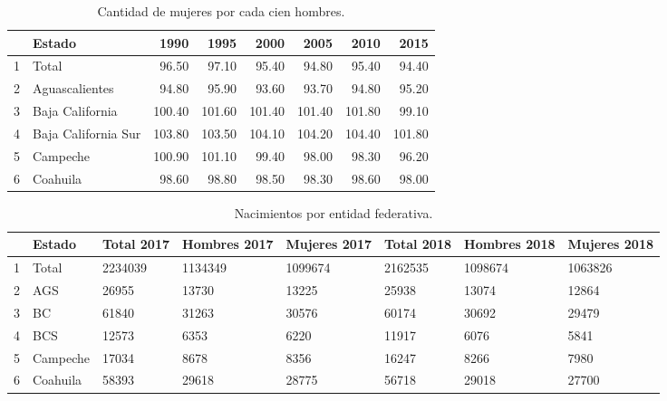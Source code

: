 \documentclass[12pt,letterpaper]{article}
\begin{document}
\begin{table}
	\centering
	\caption{Cantidad de mujeres por cada cien hombres.}
	\begin{tabular}{rlrrrrrr}
		\hline
		& Estado & 1990 & 1995 & 2000 & 2005 & 2010 & 2015 \\ 
		\hline
		1 & Total & 96.50 & 97.10 & 95.40 & 94.80 & 95.40 & 94.40 \\ 
		2 & Aguascalientes & 94.80 & 95.90 & 93.60 & 93.70 & 94.80 & 95.20 \\ 
		3 & Baja California & 100.40 & 101.60 & 101.40 & 101.40 & 101.80 & 99.10 \\ 
		4 & Baja California Sur & 103.80 & 103.50 & 104.10 & 104.20 & 104.40 & 101.80 \\ 
		5 & Campeche & 100.90 & 101.10 & 99.40 & 98.00 & 98.30 & 96.20 \\ 
		6 & Coahuila & 98.60 & 98.80 & 98.50 & 98.30 & 98.60 & 98.00 \\ 
		\hline
	\end{tabular}
	\label{hm}
\end{table}

\begin{table}
	\centering
	\caption{Nacimientos por entidad federativa.}
	\begin{tabular}{|p{} |p{}|p{}|p{}|p{}|p{}|p{}|p{}|}
		\hline
		& Estado & Total 2017 & Hombres 2017 & Mujeres 2017 & Total 2018 & Hombres 2018 & Mujeres 2018 \\ 
		\hline
		1 & Total & 2234039 & 1134349 & 1099674 & 2162535 & 1098674 & 1063826 \\ 
		2 & AGS & 26955 & 13730 & 13225 & 25938 & 13074 & 12864 \\ 
		3 & BC & 61840 & 31263 & 30576 & 60174 & 30692 & 29479 \\ 
		4 & BCS & 12573 & 6353 & 6220 & 11917 & 6076 & 5841 \\ 
		5 & Campeche & 17034 & 8678 & 8356 & 16247 & 8266 & 7980 \\ 
		6 & Coahuila  & 58393 & 29618 & 28775 & 56718 & 29018 & 27700 \\ 
		\hline
	\end{tabular}
	\label{nacimientos}
\end{table}
\end{document}
